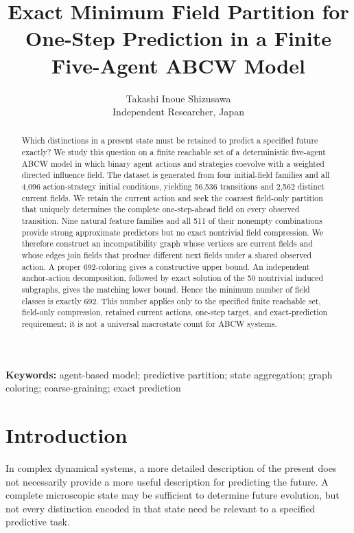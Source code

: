 \documentclass[
  11pt,
]{article}
\title{Exact Minimum Field Partition for One-Step Prediction in a Finite
Five-Agent ABCW Model}
\author{Takashi Inoue Shizusawa\\
\small Independent Researcher, Japan}
\date{}
\begin{document}
\maketitle
\begin{abstract}
Which distinctions in a present state must be retained to predict a
specified future exactly? We study this question on a finite reachable
set of a deterministic five-agent ABCW model in which binary agent
actions and strategies coevolve with a weighted directed influence
field. The dataset is generated from four initial-field families and all
4,096 action-strategy initial conditions, yielding 56,536 transitions
and 2,562 distinct current fields. We retain the current action and seek
the coarsest field-only partition that uniquely determines the complete
one-step-ahead field on every observed transition. Nine natural feature
families and all 511 of their nonempty combinations provide strong
approximate predictors but no exact nontrivial field compression. We
therefore construct an incompatibility graph whose vertices are current
fields and whose edges join fields that produce different next fields
under a shared observed action. A proper 692-coloring gives a
constructive upper bound. An independent anchor-action decomposition,
followed by exact solution of the 50 nontrivial induced subgraphs, gives
the matching lower bound. Hence the minimum number of field classes is
exactly 692. This number applies only to the specified finite reachable
set, field-only compression, retained current actions, one-step target,
and exact-prediction requirement; it is not a universal macrostate count
for ABCW systems.
\end{abstract}

\noindent\textbf{Keywords:} agent-based model; predictive partition;
state aggregation; graph coloring; coarse-graining; exact prediction

\vspace{0.75em}

\hypertarget{introduction}{%
\section{Introduction}\label{introduction}}

In complex dynamical systems, a more detailed description of the present
does not necessarily provide a more useful description for predicting
the future. A complete microscopic state may be sufficient to determine
future evolution, but not every distinction encoded in that state need
be relevant to a specified predictive task.
\end{document}
